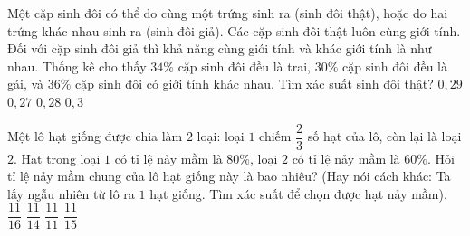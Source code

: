 \begin{ex}%
Một cặp sinh đôi có thể do cùng một trứng sinh ra (sinh đôi thật), hoặc do hai trứng
khác nhau sinh ra (sinh đôi giả). Các cặp sinh đôi thật luôn cùng giới tính. Đối với
cặp sinh đôi giả thì khả năng cùng giới tính và khác giới tính là như nhau. Thống kê
cho thấy $34\%$ cặp sinh đôi đều là trai, $30\%$ cặp sinh đôi đều là gái, và $36\%$ cặp sinh đôi có giới tính khác nhau. Tìm xác suất sinh đôi thật?
	\choice
	{$0{,}29$}
	{$0{,}27$}
	{\True$0{,}28$}
	{$0{,}3$}
\end{ex}

\begin{ex}%
	Một lô hạt giống được chia làm $2$ loại: loại $1$ chiếm $\dfrac{2}{3}$ số hạt của lô, còn lại là loại $2$. Hạt trong loại $1$ có tỉ lệ nảy mầm là $80\%$, loại $2$ có tỉ lệ nảy mầm là $60\%$. Hỏi tỉ lệ nảy mầm chung của lô hạt giống này là bao nhiêu? (Hay nói cách khác: Ta lấy ngẫu nhiên từ lô ra $1$ hạt giống. Tìm xác suất để chọn được hạt nảy mầm).
	\choice
	{$\dfrac{11}{16}$}
	{$\dfrac{11}{14}$}
	{$\dfrac{11}{11}$}
	{\True$\dfrac{11}{15}$}
\end{ex}

